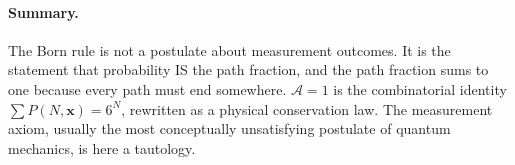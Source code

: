 \paragraph{Summary.}
The Born rule is not a postulate about measurement outcomes.
It is the statement that probability IS the path fraction, and the path
fraction sums to one because every path must end somewhere.
$\mathcal{A} = 1$ is the combinatorial identity $\sum P(N,\mathbf{x}) = 6^N$,
rewritten as a physical conservation law.
The measurement axiom, usually the most conceptually unsatisfying postulate
of quantum mechanics, is here a tautology.
